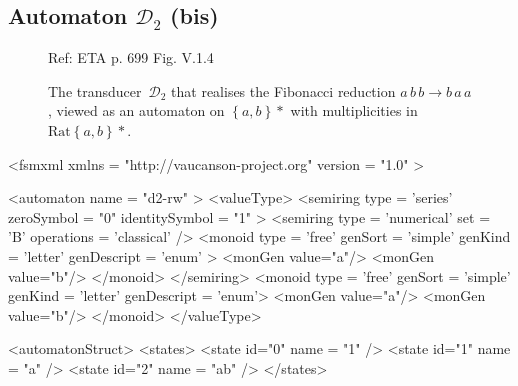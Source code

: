 \subsection{Automaton $\mathcal{D}_{2}$ (bis)}
\label{automatonD2rw}
\begin{figure}[h]
  \begin{minipage}[c]{.60\textwidth}
    Ref: ETA p. 699  Fig. V.1.4

    The transducer~$\mathcal{D}_{2}$ that realises the Fibonacci reduction
    $a\, b\, b \rightarrow b\, a\, a$, viewed as an automaton on
    $\left\{ a,b \right\}*$ with multiplicities in $\mathrm{Rat}\left\{ a,b \right\}*$.
  \end{minipage}
  \begin{minipage}[c]{.40\textwidth}


  \end{minipage}
\end{figure}

{\footnotesize
\begin{listing}[5]{1}
<fsmxml  xmlns   = "http://vaucanson-project.org"
         version = "1.0" >

<automaton name = "d2-rw" >
  <valueType>
    <semiring  type       = 'series'
               zeroSymbol     = "0"
               identitySymbol = "1" >
      <semiring  type       = 'numerical'
                 set        = 'B'
                 operations = 'classical' />
      <monoid    type       = 'free'
                 genSort    = 'simple'
                 genKind    = 'letter'
                 genDescript = 'enum' >
        <monGen value="a"/>
        <monGen value="b"/>
      </monoid>
    </semiring>
    <monoid    type       = 'free'
               genSort    = 'simple'
               genKind    = 'letter'
               genDescript = 'enum'>
      <monGen value="a"/>
      <monGen value="b"/>
    </monoid>
  </valueType>

  <automatonStruct>
    <states>
      <state  id="0"  name = "1" />
      <state  id="1"  name = "a" />
      <state  id="2"  name = "ab" />
    </states>
\end{listing}
}

